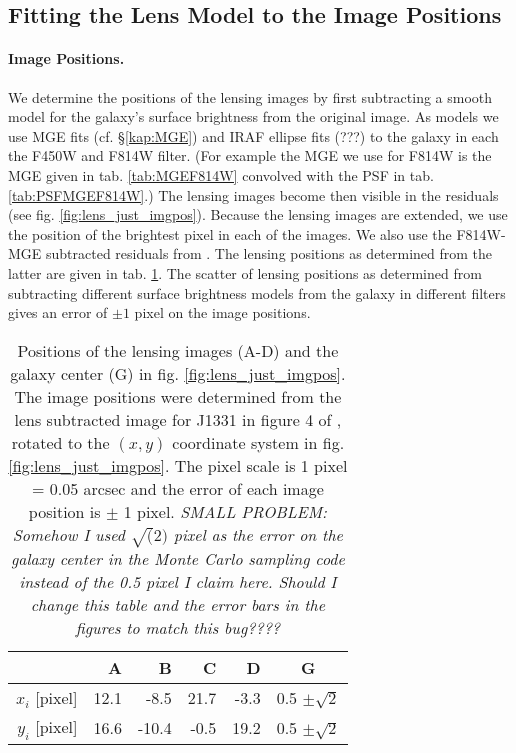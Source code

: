 \subsection{Fitting the Lens Model to the Image Positions}

\paragraph{Image Positions.} We determine the positions of the lensing images by first subtracting a smooth model for the galaxy's surface brightness from the original image. As models we use MGE fits (cf. \S\ref{kap:MGE}) and IRAF ellipse fits (???) to the galaxy in each the F450W and F814W filter. (For example the MGE we use for F814W is the MGE given in tab. \ref{tab:MGEF814W} convolved with the PSF in tab. \ref{tab:PSFMGEF814W}.) The lensing images become then visible in the residuals (see fig. \ref{fig:lens_just_imgpos}). Because the lensing images are extended, we use the position of the brightest pixel in each of the images. We also use the F814W-MGE subtracted residuals from \citet{SWELLSIII}. The lensing positions as determined from the latter are given in tab. \ref{tab:lenspos}. The scatter of lensing positions as determined from subtracting different surface brightness models from the galaxy in different filters gives an error of $\pm 1$ pixel on the image positions.

\begin{table}
\centering
\begin{minipage}{70mm}
\begin{tabular}{r|rrrr|c}
\hline
  & A & B & C & D & G\\\hline
$x_i$ [pixel] & 12.1 & -8.5 & 21.7 & -3.3 & 0.5 $\pm \sqrt{2}$ \\
$y_i$ [pixel] & 16.6 & -10.4 & -0.5 & 19.2 & 0.5 $\pm \sqrt{2}$ \\
\hline
\end{tabular}
\caption{Positions of the lensing images (A-D) and the galaxy center (G) in fig. \ref{fig:lens_just_imgpos}. The image positions were determined from the lens subtracted image for J1331 in figure 4 of \citet{SWELLSIII}, rotated to the $(x,y)$ coordinate system in fig. \ref{fig:lens_just_imgpos}. The pixel scale is 1 pixel = 0.05 arcsec and the error of each image position is $\pm$ 1 pixel. \textit{SMALL PROBLEM: Somehow I used $\sqrt(2)$ pixel as the error on the galaxy center in the Monte Carlo sampling code instead of the 0.5 pixel I claim here. Should I change this table and the error bars in the figures to match this bug????}}
\label{tab:lenspos}
\end{minipage}
\end{table}


